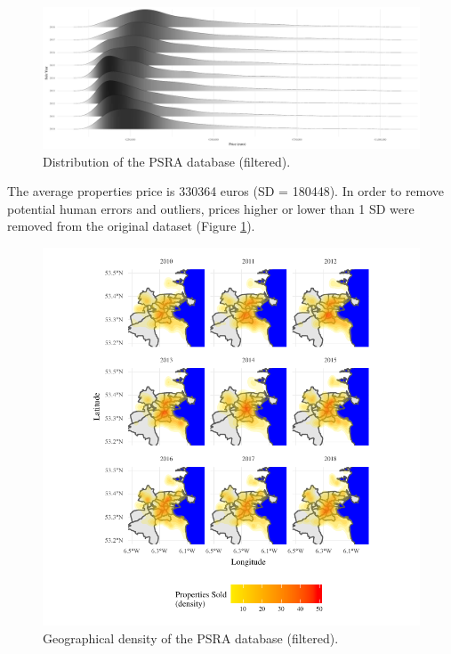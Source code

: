 \documentclass[]{elsarticle} %
\begin{document}
\begin{figure}[H]

{\centering \includegraphics{property_price_paper_new_files/figure-latex/distrib-plot-1} 

}

\caption{Distribution of the PSRA database (filtered).}\label{fig:distrib-plot}
\end{figure}

The average properties price is 330364 euros (SD = 180448). In order to
remove potential human errors and outliers, prices higher or lower than
1 SD were removed from the original dataset (Figure
\ref{fig:distrib-plot}).

\begin{figure}[H]

{\centering \includegraphics{property_price_paper_new_files/figure-latex/density-plot-1} 

}

\caption{Geographical density of the PSRA database (filtered).}\label{fig:density-plot}
\end{figure}
\end{document}
